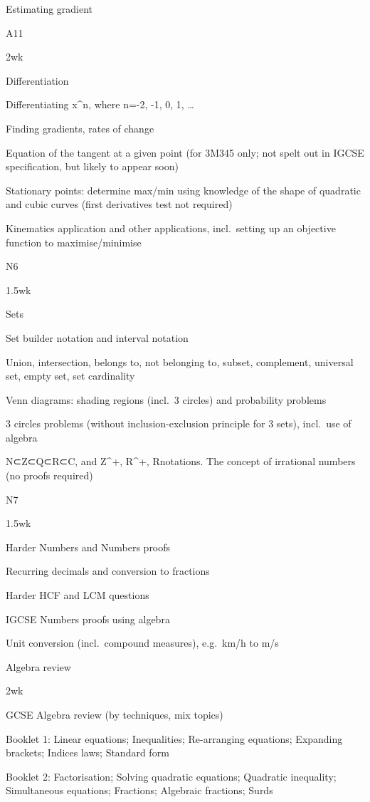 \documentclass[
]{article}
\begin{document}
Estimating gradient

A11

2wk

Differentiation

Differentiating x\^{}n, where n=-2, -1, 0, 1, \ldots{}

Finding gradients, rates of change

Equation of the tangent at a given point (for 3M345 only; not spelt out
in IGCSE specification, but likely to appear soon)

Stationary points: determine max/min using knowledge of the shape of
quadratic and cubic curves (first derivatives test not required)

Kinematics application and other applications, incl.~setting up an
objective function to maximise/minimise

N6

1.5wk

Sets

Set builder notation and interval notation

Union, intersection, belongs to, not belonging to, subset, complement,
universal set, empty set, set cardinality

Venn diagrams: shading regions (incl.~3 circles) and probability
problems

3 circles problems (without inclusion-exclusion principle for 3 sets),
incl.~use of algebra

N⊂Z⊂Q⊂R⊂C, and Z\^{}+, R\^{}+, R\Q notations. The concept of irrational
numbers (no proofs required)

N7

1.5wk

Harder Numbers and Numbers proofs

Recurring decimals and conversion to fractions

Harder HCF and LCM questions

IGCSE Numbers proofs using algebra

Unit conversion (incl.~compound measures), e.g.~km/h to m/s

Algebra review

2wk

GCSE Algebra review (by techniques, mix topics)

Booklet 1: Linear equations; Inequalities; Re-arranging equations;
Expanding brackets; Indices laws; Standard form

Booklet 2: Factorisation; Solving quadratic equations; Quadratic
inequality; Simultaneous equations; Fractions; Algebraic fractions;
Surds
\end{document}
